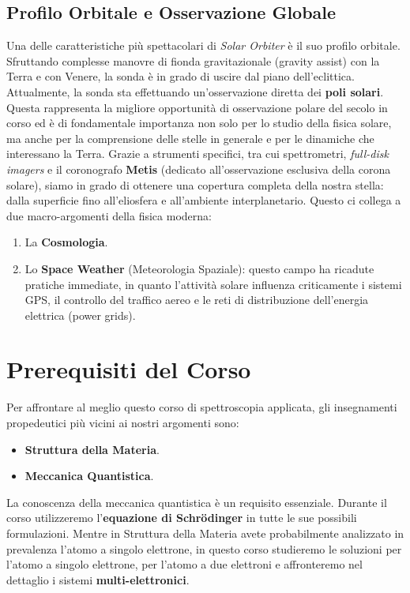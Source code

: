     \subsection{Profilo Orbitale e Osservazione Globale}
    Una delle caratteristiche più spettacolari di \textit{Solar Orbiter} è il suo profilo orbitale. Sfruttando complesse manovre di fionda gravitazionale (gravity assist) con la Terra e con Venere, la sonda è in grado di uscire dal piano dell'eclittica. Attualmente, la sonda sta effettuando un'osservazione diretta dei \textbf{poli solari}. Questa rappresenta la migliore opportunità di osservazione polare del secolo in corso ed è di fondamentale importanza non solo per lo studio della fisica solare, ma anche per la comprensione delle stelle in generale e per le dinamiche che interessano la Terra. Grazie a strumenti specifici, tra cui spettrometri, \textit{full-disk imagers} e il coronografo \textbf{Metis} (dedicato all'osservazione esclusiva della corona solare), siamo in grado di ottenere una copertura completa della nostra stella: dalla superficie fino all'eliosfera e all'ambiente interplanetario. Questo ci collega a due macro-argomenti della fisica moderna:\begin{enumerate}\item La \textbf{Cosmologia}.\item Lo \textbf{Space Weather} (Meteorologia Spaziale): questo campo ha ricadute pratiche immediate, in quanto l'attività solare influenza criticamente i sistemi GPS, il controllo del traffico aereo e le reti di distribuzione dell'energia elettrica (power grids).\end{enumerate}
    
\section{Prerequisiti del Corso}
Per affrontare al meglio questo corso di spettroscopia applicata, gli insegnamenti propedeutici più vicini ai nostri argomenti sono:\begin{itemize}\item \textbf{Struttura della Materia}.\item \textbf{Meccanica Quantistica}.\end{itemize}La conoscenza della meccanica quantistica è un requisito essenziale. Durante il corso utilizzeremo l'\textbf{equazione di Schrödinger} in tutte le sue possibili formulazioni. Mentre in Struttura della Materia avete probabilmente analizzato in prevalenza l'atomo a singolo elettrone, in questo corso studieremo le soluzioni per l'atomo a singolo elettrone, per l'atomo a due elettroni e affronteremo nel dettaglio i sistemi \textbf{multi-elettronici}.

